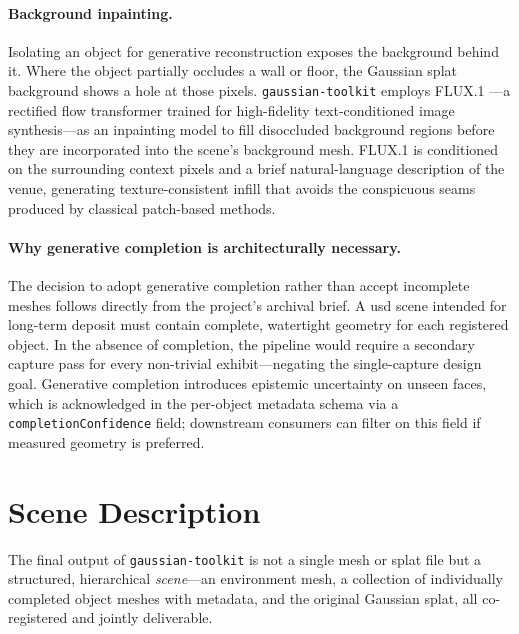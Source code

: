 \paragraph{Background inpainting.}
Isolating an object for generative reconstruction exposes the background behind
it. Where the object partially occludes a wall or floor, the Gaussian splat
background shows a hole at those pixels. \texttt{gaussian-toolkit} employs
FLUX.1 \parencite{FLUX2024}---a rectified flow transformer trained for
high-fidelity text-conditioned image synthesis---as an inpainting model to fill
disoccluded background regions before they are incorporated into the scene's
background mesh. FLUX.1 is conditioned on the surrounding context pixels and a
brief natural-language description of the venue, generating texture-consistent
infill that avoids the conspicuous seams produced by classical patch-based methods.

\paragraph{Why generative completion is architecturally necessary.}
The decision to adopt generative completion rather than accept incomplete meshes
follows directly from the project's archival brief. A \acrshort{usd} scene intended
for long-term deposit must contain complete, watertight geometry for each registered
object. In the absence of completion, the pipeline would require a secondary capture
pass for every non-trivial exhibit---negating the single-capture design goal.
Generative completion introduces epistemic uncertainty on unseen faces, which is
acknowledged in the per-object metadata schema via a \texttt{completionConfidence}
field; downstream consumers can filter on this field if measured geometry is
preferred.

\section{Scene Description}\label{sec:usd}

The final output of \texttt{gaussian-toolkit} is not a single mesh or splat file
but a structured, hierarchical \emph{scene}---an environment mesh, a collection
of individually completed object meshes with metadata, and the original Gaussian
splat, all co-registered and jointly deliverable.

